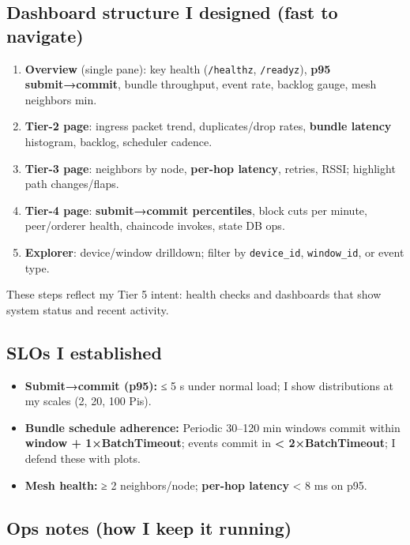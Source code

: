 \documentclass[12pt]{article}
\begin{document}
\subsection{Dashboard structure I designed (fast to navigate)}

\begin{enumerate}
\item \textbf{Overview} (single pane): key health (\texttt{/healthz}, \texttt{/readyz}), \textbf{p95 submit→commit}, bundle throughput, event rate, backlog gauge, mesh neighbors min.
\item \textbf{Tier-2 page}: ingress packet trend, duplicates/drop rates, \textbf{bundle latency} histogram, backlog, scheduler cadence.
\item \textbf{Tier-3 page}: neighbors by node, \textbf{per-hop latency}, retries, RSSI; highlight path changes/flaps.
\item \textbf{Tier-4 page}: \textbf{submit→commit percentiles}, block cuts per minute, peer/orderer health, chaincode invokes, state DB ops.
\item \textbf{Explorer}: device/window drilldown; filter by \texttt{device\_id}, \texttt{window\_id}, or event type.
\end{enumerate}
These steps reflect my Tier 5 intent: health checks and dashboards that show system status and recent activity.

\subsection{SLOs I established}

\begin{itemize}
\item \textbf{Submit→commit (p95):} ≤ 5 s under normal load; I show distributions at my scales (2, 20, 100 Pis).
\item \textbf{Bundle schedule adherence:} Periodic 30–120 min windows commit within \textbf{window + 1×BatchTimeout}; events commit in \textbf{< 2×BatchTimeout}; I defend these with plots.
\item \textbf{Mesh health:} ≥ 2 neighbors/node; \textbf{per-hop latency} < 8 ms on p95.
\end{itemize}

\subsection{Ops notes (how I keep it running)}
\end{document}
